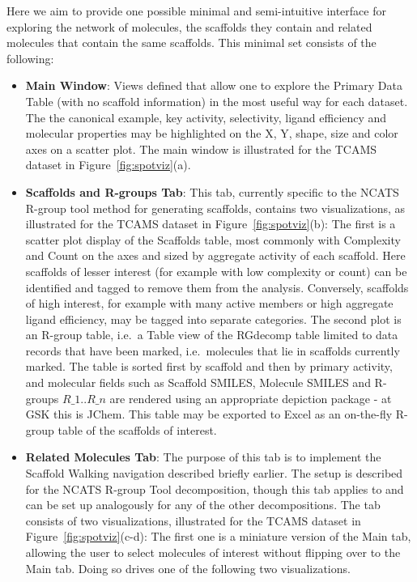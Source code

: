\documentclass[journal=jacsat,manuscript=article]{achemso}
\newcommand*\fref[1]{Figure~\ref{fig:#1}}
\newcommand*\ie{i.e.~}
\begin{document}
Here we aim to provide one possible minimal and semi-intuitive interface for exploring the network of molecules, the scaffolds they contain and related molecules that contain the same scaffolds. This minimal set consists of the following:
\begin{itemize}
\item {\bf Main Window}: Views defined that allow one to explore the Primary Data Table (with no scaffold information) in the most useful way for each dataset.  The the canonical example, key activity, selectivity, ligand efficiency and molecular properties may be highlighted on the X, Y, shape, size and color axes on a scatter plot. The main window is illustrated for the TCAMS dataset in \fref{spotviz}(a).
\item {\bf Scaffolds and R-groups Tab}: This tab, currently specific to the NCATS R-group tool method for generating scaffolds, contains two visualizations, as illustrated for the TCAMS dataset in \fref{spotviz}(b):  
\subitem The first is a scatter plot display of the Scaffolds table, most commonly with Complexity and Count on the axes and sized by aggregate activity of each scaffold.  Here scaffolds of lesser interest (for example with low complexity or count) can be identified and tagged to remove them from the analysis. Conversely, scaffolds of high interest, for example with many active members or high aggregate ligand efficiency, may be tagged into separate categories.
\subitem The second plot is an R-group table, \ie a Table view of the {RG}decomp table limited to data records that have been marked, \ie molecules that lie in scaffolds currently marked. The table is sorted first by scaffold and then by primary activity, and molecular fields such as Scaffold SMILES, Molecule SMILES and R-groups $R\_1..R\_n$ are rendered using an appropriate depiction package - at GSK this is {JChem}.  This table may be exported to Excel as an on-the-fly R-group table of the scaffolds of interest.
\item {\bf Related Molecules Tab}: The purpose of this tab is to implement the Scaffold Walking navigation described briefly earlier.  The setup is described for the NCATS R-group Tool decomposition, though this tab applies to and can be set up analogously for any of the other decompositions. The tab consists of two visualizations, illustrated for the TCAMS dataset in \fref{spotviz}(c-d):
\subitem The first one is a miniature version of the Main tab, allowing the user to select molecules of interest without flipping over to the Main tab. Doing so drives one of the following two visualizations.

\end{itemize}
\end{document}
